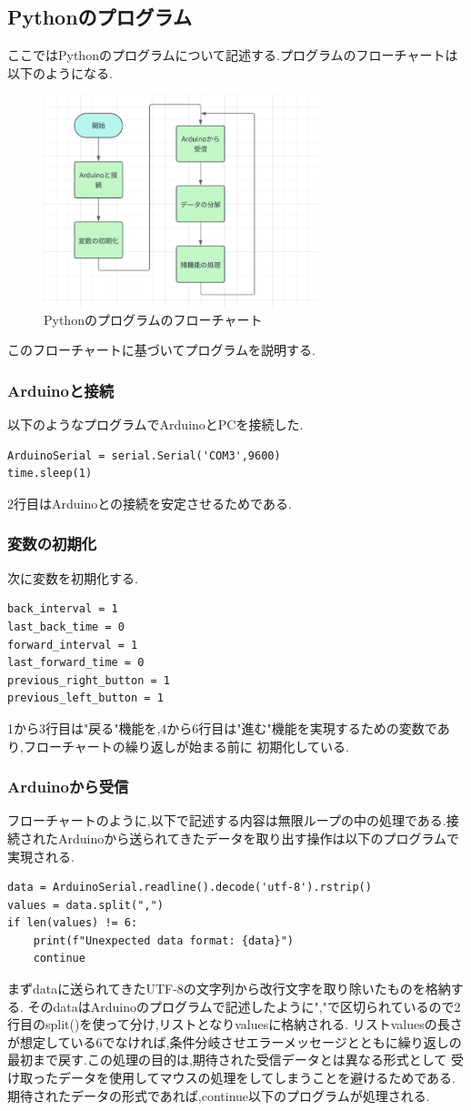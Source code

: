 \documentclass[dvipdfmx]{jarticle}
\begin{document}
\subsection{Pythonのプログラム}
ここではPythonのプログラムについて記述する.プログラムのフローチャートは以下のようになる.
\begin{figure}[h]
    \centering
    \includegraphics[width=8cm]{python_hurotya.png}
    \caption{Pythonのプログラムのフローチャート}
\end{figure}
このフローチャートに基づいてプログラムを説明する.
\subsubsection{Arduinoと接続}
以下のようなプログラムでArduinoとPCを接続した.
\begin{lstlisting}
ArduinoSerial = serial.Serial('COM3',9600)
time.sleep(1)
\end{lstlisting}
2行目はArduinoとの接続を安定させるためである.
\subsubsection{変数の初期化}
次に変数を初期化する.
\begin{lstlisting}
back_interval = 1
last_back_time = 0
forward_interval = 1
last_forward_time = 0
previous_right_button = 1
previous_left_button = 1
\end{lstlisting}
1から3行目は"戻る"機能を,4から6行目は"進む"機能を実現するための変数であり,フローチャートの繰り返しが始まる前に
初期化している.
\subsubsection{Arduinoから受信}
フローチャートのように,以下で記述する内容は無限ループの中の処理である.接続されたArduinoから送られてきたデータを取り出す操作は以下のプログラムで実現される.
\begin{lstlisting}
data = ArduinoSerial.readline().decode('utf-8').rstrip()
values = data.split(",")
if len(values) != 6:
    print(f"Unexpected data format: {data}")
    continue
\end{lstlisting}
まずdataに送られてきたUTF-8の文字列から改行文字を取り除いたものを格納する.
そのdataはArduinoのプログラムで記述したように","で区切られているので2行目のsplit()を使って分け,リストとなりvaluesに格納される.
リストvaluesの長さが想定している6でなければ,条件分岐させエラーメッセージとともに繰り返しの最初まで戻す.この処理の目的は,期待された受信データとは異なる形式として
受け取ったデータを使用してマウスの処理をしてしまうことを避けるためである.期待されたデータの形式であれば,continue以下のプログラムが処理される.
\end{document}
